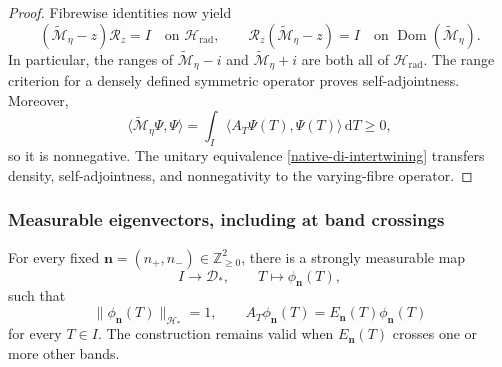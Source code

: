 \begin{proof}
Fibrewise identities now yield
\[
 (\widetilde{\mathscr M}_\eta-z)\mathcal R_z=I
 \quad\text{on }\mathscr H_{\mathrm{rad}},
 \qquad
 \mathcal R_z(\widetilde{\mathscr M}_\eta-z)=I
 \quad\text{on }\operatorname{Dom}(\widetilde{\mathscr M}_\eta).
\]
In particular, the ranges of
\(\widetilde{\mathscr M}_\eta-i\) and
\(\widetilde{\mathscr M}_\eta+i\) are both all of
\(\mathscr H_{\mathrm{rad}}\).  The range criterion for a densely defined
symmetric operator proves self-adjointness.  Moreover,
\[
 \langle\widetilde{\mathscr M}_\eta\Psi,\Psi\rangle
 =\int_I\langle A_T\Psi(T),\Psi(T)\rangle\,\mathrm d T\ge0,
\]
so it is nonnegative.  The unitary equivalence
\eqref{native-di-intertwining} transfers density, self-adjointness, and
nonnegativity to the varying-fibre operator.
\end{proof}

\subsubsection{Measurable eigenvectors, including at band crossings}

\begin{lemma}
\label{native-di-measurable-eigenvector-lemma}
For every fixed
\(\mathbf n=(n_+,n_-)\in\mathbb Z_{\ge0}^2\), there is a strongly
measurable map
\[
 I\longrightarrow\mathscr D_*,
 \qquad T\longmapsto\phi_{\mathbf n}(T),
\]
such that
\begin{equation}
 \|\phi_{\mathbf n}(T)\|_{\mathscr H_*}=1,
 \qquad
 A_T\phi_{\mathbf n}(T)
 =E_{\mathbf n}(T)\phi_{\mathbf n}(T)
\label{native-di-measurable-eigenvector}
\end{equation}
for every \(T\in I\).  The construction remains valid when
\(E_{\mathbf n}(T)\) crosses one or more other bands.
\end{lemma}

